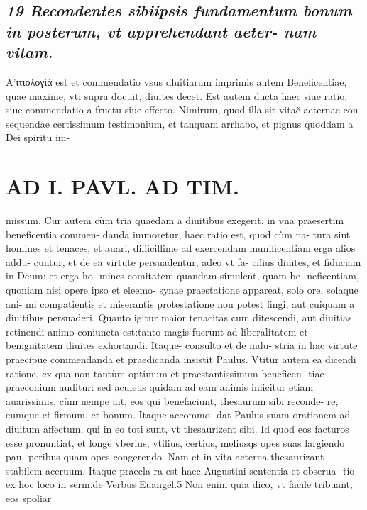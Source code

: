 \documentclass{article}
\begin{document}
\begin{pages}
\subsection*{\textit{19 Recondentes sibiipsis fundamentum bonum in posterum, vt apprehendant aeter- nam vitam. }}\pstart Α'ιτιολογίά est et commendatio vsus dluitiarum imprimis autem Beneficentiae, quae maxime, vti supra docuit, diuites decet. Est autem ducta haec siue ratio, siue commendatio a fructu siue effecto. Nimirum, quod illa sit vitaẽ aeternae con- sequendae certissimum testimonium, et tanquam arrhabo, et pignus quoddam a Dei spiritu im-  \pend
\section*{AD I. PAVL. AD TIM. }
\marginpar{[ p.304. ]}\pstart missum. Cur autem cùm tria quaedam a diuitibus exegerit, in vna praesertim beneficentia commen- danda immoretur, haec ratio est, quod cùm na- tura sint homines et tenaces, et auari, difficillime ad exercendam munificentiam erga alios addu- cuntur, et de ea virtute persuadentur, adeo vt fa- cilius diuites, et fiduciam in Deum: et erga ho- mines comitatem quandam simulent, quam be- neficentiam, quoniam nisi opere ipso et eleemo- synae praestatione appareat, solo ore, solaque ani- mi compatientis et miserantis protestatione non potest fingi, aut cuiquam a diuitibus persuaderi. Quanto igitur maior tenacitas cum ditescendi, aut diuitias retinendi animo coniuncta est:tanto magis fuerunt ad liberalitatem et benignitatem diuites exhortandi. Itaque- consulto et de indu- stria in hac virtute praecipue commendanda et praedicanda insistit Paulus.  \pend\pstart Vtitur autem ea dicendi ratione, ex qua non tantùm optimum et praestantissimum beneficen- tiae praeconium auditur: sed aculeus quidam ad eam animis iniicitur etiam auarissimis, cùm nempe ait, eos qui benefaciunt, thesaurum sibi reconde- re, eumque et firmum, et bonum. Itaque  accommo- dat Paulus suam orationem ad diuitum affectum, qui in eo toti sunt, vt thesaurizent sibi. Id quod eos facturos esse pronuntiat, et longe vberius, vtilius, certius, meliusqs opes suas largiendo pau- peribus quam opes congerendo. Nam et in vita aeterna thesaurizant stabilem aceruum. Itaque  praecla ra est haec Augustini sententia et obserua- tio ex hoc loco in serm.de Verbus  Euangel.5 Non enim quia dico, vt facile tribuant, eos spoliar  \pend

\end{pages}
\end{document}
